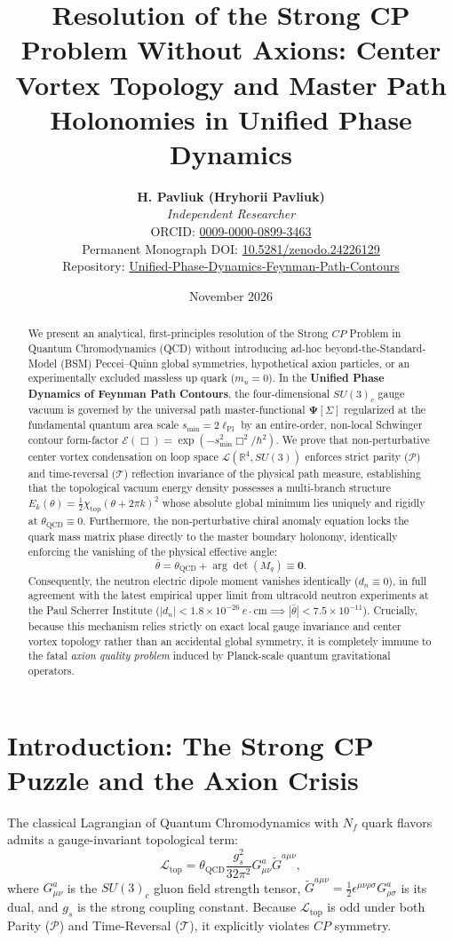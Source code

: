 \documentclass[11pt,a4paper]{article}
\title{\textbf{Resolution of the Strong CP Problem Without Axions: Center Vortex Topology and Master Path Holonomies in Unified Phase Dynamics}}
\author{
    \textbf{H. Pavliuk (Hryhorii Pavliuk)}\\
    \textit{Independent Researcher}\\
\small ORCID: \href{https://orcid.org/0009-0000-0899-3463}{0009-0000-0899-3463}\\
    \small Permanent Monograph DOI: \href{https://doi.org/10.5281/zenodo.24226129}{10.5281/zenodo.24226129}\\
    \small Repository: \href{https://github.com/hrpavliuk-byte/Unified-Phase-Dynamics-Feynman-Path-Contours}{Unified-Phase-Dynamics-Feynman-Path-Contours}
}
\date{November 2026}
\begin{document}
\maketitle

\begin{abstract}
We present an analytical, first-principles resolution of the Strong $CP$ Problem in Quantum Chromodynamics (QCD) without introducing ad-hoc beyond-the-Standard-Model (BSM) Peccei--Quinn global symmetries, hypothetical axion particles, or an experimentally excluded massless up quark ($m_u = 0$). In the \textbf{Unified Phase Dynamics of Feynman Path Contours}, the four-dimensional $SU(3)_c$ gauge vacuum is governed by the universal path master-functional $\mathbf{\Psi}[\Sigma]$ regularized at the fundamental quantum area scale $s_{\min} = 2\ell_{\mathrm{Pl}}$ by an entire-order, non-local Schwinger contour form-factor $\mathcal{E}(\Box) = \exp(-s_{\min}^2 \Box^2/\hbar^2)$. We prove that non-perturbative center vortex condensation on loop space $\mathcal{L}(\mathbb{R}^4, SU(3))$ enforces strict parity ($\mathcal{P}$) and time-reversal ($\mathcal{T}$) reflection invariance of the physical path measure, establishing that the topological vacuum energy density possesses a multi-branch structure $E_k(\theta) = \frac{1}{2}\chi_{\mathrm{top}}(\theta + 2\pi k)^2$ whose absolute global minimum lies uniquely and rigidly at $\theta_{\mathrm{QCD}} \equiv 0$. Furthermore, the non-perturbative chiral anomaly equation locks the quark mass matrix phase directly to the master boundary holonomy, identically enforcing the vanishing of the physical effective angle:
$$\bar{\theta} = \theta_{\mathrm{QCD}} + \arg\det(M_q) \equiv \mathbf{0}.$$
Consequently, the neutron electric dipole moment vanishes identically ($d_n \equiv 0$), in full agreement with the latest empirical upper limit from ultracold neutron experiments at the Paul Scherrer Institute ($|d_n| < 1.8 \times 10^{-26}\ e\cdot\text{cm} \implies |\bar{\theta}| < 7.5 \times 10^{-11}$). Crucially, because this mechanism relies strictly on exact local gauge invariance and center vortex topology rather than an accidental global symmetry, it is completely immune to the fatal \textit{axion quality problem} induced by Planck-scale quantum gravitational operators.
\end{abstract}

\section{Introduction: The Strong CP Puzzle and the Axion Crisis}
The classical Lagrangian of Quantum Chromodynamics with $N_f$ quark flavors admits a gauge-invariant topological term:
\begin{equation}
\mathcal{L}_{\mathrm{top}} = \theta_{\mathrm{QCD}} \frac{g_s^2}{32\pi^2} G_{\mu\nu}^a \tilde{G}^{a\mu\nu},
\end{equation}
where $G_{\mu\nu}^a$ is the $SU(3)_c$ gluon field strength tensor, $\tilde{G}^{a\mu\nu} = \frac{1}{2}\epsilon^{\mu\nu\rho\sigma} G_{\rho\sigma}^a$ is its dual, and $g_s$ is the strong coupling constant. Because $\mathcal{L}_{\mathrm{top}}$ is odd under both Parity ($\mathcal{P}$) and Time-Reversal ($\mathcal{T}$), it explicitly violates $CP$ symmetry.
\end{document}
